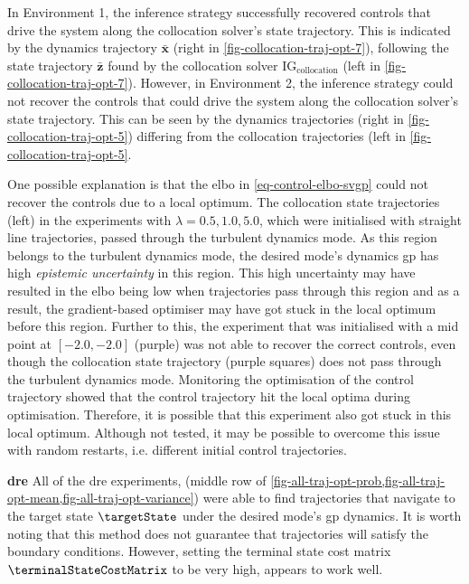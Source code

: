 \documentclass{mimosis-class/mimosis}
\numberwithin{equation}{chapter}
\begin{document}
{In Environment 1, the inference strategy successfully recovered controls that
drive the system along the collocation solver's state trajectory.
This is indicated by the dynamics trajectory \(\bar{\mathbf{x}}\) (right in \cref{fig-collocation-traj-opt-7}),
following the state trajectory \(\bar{\mathbf{z}}\) found by the collocation solver
\(\text{IG}_{\text{collocation}}\) (left in \cref{fig-collocation-traj-opt-7}).
However, in Environment 2, the inference strategy could not recover the controls that could drive the system
along the collocation solver's state trajectory.
This can be seen by the dynamics trajectories (right in \cref{fig-collocation-traj-opt-5})
differing from the collocation trajectories (left in \cref{fig-collocation-traj-opt-5}.

One possible explanation is that the \acrshort{elbo} in \cref{eq-control-elbo-svgp} could not
recover the controls due to a local optimum.
The collocation state trajectories (left) in the experiments with \(\lambda=0.5, 1.0, 5.0\), which were initialised
with straight line trajectories, passed through the turbulent dynamics mode.
As this region belongs to the turbulent dynamics mode, the desired mode's dynamics \acrshort{gp} has high \emph{epistemic uncertainty}
in this region.
This high uncertainty may have resulted in the \acrshort{elbo} being low when trajectories pass through this region and
as a result, the gradient-based optimiser may have got stuck in the local optimum before this region.
Further to this, the experiment that was initialised with a mid point at \([-2.0, -2.0]\) (purple)
was not able to recover the correct controls, even though the collocation state trajectory (purple squares)
does not pass through the turbulent dynamics mode.
Monitoring the optimisation of the control trajectory showed that the control trajectory
hit the local optima during optimisation.
Therefore, it is possible that this experiment also got stuck in this local optimum.
Although not tested, it may be possible to overcome this issue with random restarts, i.e. different initial
control trajectories.

\textbf{\acrfull{dre}}
All of the \acrshort{dre} experiments, (middle row of
\cref{fig-all-traj-opt-prob,fig-all-traj-opt-mean,fig-all-traj-opt-variance})
were able to find trajectories
that navigate to the target state \(\targetState\) under the desired mode's \acrshort{gp} dynamics.
It is worth noting that this method does not guarantee that trajectories will satisfy the boundary conditions.
However, setting the terminal state cost matrix \(\terminalStateCostMatrix\) to be very high,
appears to work well.

}
\end{document}
